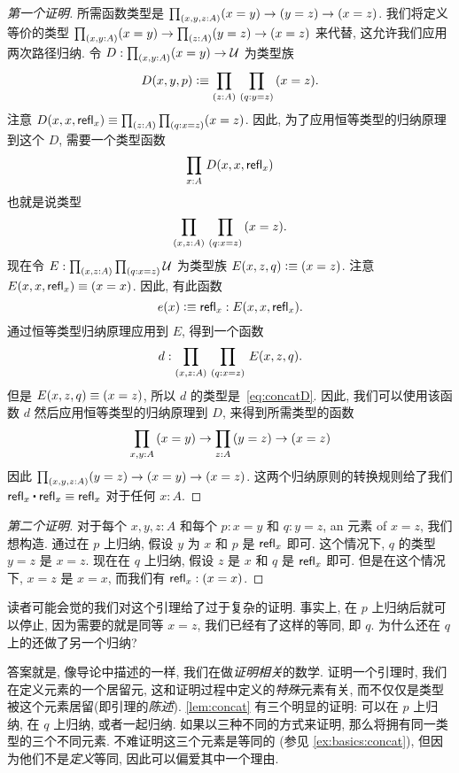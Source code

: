 \begin{proof}[第一个证明]
    所需函数类型是 $\prd{x,y,z:A} (x= y) \to (y= z)\to (x= z)$.
    我们将定义等价的类型 $\prd{x,y:A} (x= y) \to \prd{z:A} (y= z)\to (x= z)$ 来代替, 这允许我们应用两次路径归纳.
    令 $D:\prd{x,y:A} (x=y) \to \type$ 为类型族
    \begin{equation*}
        D(x,y,p)\defeq \prd{z:A}{q:y=z} (x=z).
    \end{equation*}
    注意 $D(x,x,\refl x) \jdeq \prd{z:A}{q:x=z} (x=z)$.
    因此, 为了应用恒等类型的归纳原理到这个 $D$, 需要一个类型函数
    \begin{equation}
        \label{eq:concatD}
        \prd{x:A} D(x,x,\refl{x})
    \end{equation}
    也就是说类型
    \[ \prd{x,z:A}{q:x=z} (x=z). \]
    现在令 $E:\prd{x,z:A}{q:x=z}\type$ 为类型族 $E(x,z,q)\vcentcolon\equiv (x=z)$.
    注意 $E(x,x,\mathsf{refl}_{x}) \equiv (x=x)$.
    因此, 有此函数
    \begin{equation*}
        e(x) \vcentcolon\equiv \mathsf{refl}_{x} : E(x,x,\mathsf{refl}_{x}).
    \end{equation*}
    通过恒等类型归纳原理应用到 $E$, 得到一个函数
    \begin{equation*}
        d : \prd{x,z:A}{q:x=z} E(x,z,q).
    \end{equation*}
    但是 $E(x,z,q)\equiv (x=z)$, 所以 $d$ 的类型是~\eqref{eq:concatD}.
    因此, 我们可以使用该函数 $d$ 然后应用恒等类型的归纳原理到 $D$, 来得到所需类型的函数
    \begin{equation*}
        \prd{x,y:A} (x= y) \to \prd{z:A} (y= z)\to (x= z)
    \end{equation*}
    因此 $\prd{x,y,z:A} (y=z) \to (x=y) \to (x=z)$.
    这两个归纳原则的转换规则给了我们 $\refl{x}\ct \refl{x}\jdeq \refl{x}$ 对于任何 $x:A$.
\end{proof}

\begin{proof}[第二个证明]
    对于每个 $x,y,z:A$ 和每个 $p:x=y$ 和 $q:y=z$, an 元素 of $x=z$, 我们想构造.
    通过在 $p$ 上归纳, 假设 $y$ 为 $x$ 和 $p$ 是 $\mathsf{refl}_{x}$ 即可.
    这个情况下, $q$ 的类型 $y=z$ 是 $x=z$.
    现在在 $q$ 上归纳, 假设 $z$ 是 $x$ 和 $q$ 是 $\mathsf{refl}_{x}$ 即可.
    但是在这个情况下, $x=z$ 是 $x=x$, 而我们有 $\mathsf{refl}_{x}:(x=x)$.
\end{proof}

读者可能会觉的我们对这个引理给了过于复杂的证明. 事实上, 在 $p$ 上归纳后就可以停止, 因为需要的就是同等 $x=z$, 我们已经有了这样的等同, 即 $q$.
为什么还在 $q$ 上的还做了另一个归纳?

答案就是, 像导论中描述的一样, 我们在做\emph{证明相关}的数学.
%
证明一个引理时, 我们在定义元素的一个居留元, 这和证明过程中定义的\emph{特殊}元素有关, 而不仅仅是类型被这个元素居留(即引理的\emph{陈述}).
\cref{lem:concat} 有三个明显的证明: 可以在 $p$ 上归纳, 在 $q$ 上归纳, 或者一起归纳.
如果以三种不同的方式来证明, 那么将拥有同一类型的三个不同元素.
不难证明这三个元素是等同的 (参见 \cref{ex:basics:concat}), 但因为他们不是\emph{定义}等同, 因此可以偏爱其中一个理由.

